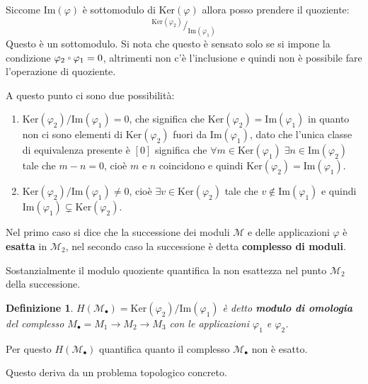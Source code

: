 \documentclass[10pt, twoside=false, x11names]{scrbook}
\newtheorem{definition}[theorem]{Definizione}
\newcommand{\M}{\mathcal{M}}
\newcommand{\im}[1]{\mathrm{Im}( #1 )}
\renewcommand{\ker}[1]{\mathrm{Ker}( #1)}
\newcommand*\quot[2]{{^{\textstyle #1}\big/_{\textstyle #2}}}
\let\latexcirc=\circ
\newcommand{\ccirc}{\mathbin{\mathchoice
  {\xcirc\scriptstyle}
  {\xcirc\scriptstyle}
  {\xcirc\scriptscriptstyle}
  {\xcirc\scriptscriptstyle}
}}
\newcommand{\xcirc}[1]{\vcenter{\hbox{$#1\latexcirc$}}}
\let\circ\ccirc
\let\phi\varphi
\begin{document}
Siccome $ \im{\phi} $ è sottomodulo di $ \ker{\phi} $ allora posso prendere
il quoziente:
\[
  \quot{\ker{\phi_2}}{\im{\phi_1}}
\]
Questo è un sottomodulo. Si nota che questo è sensato solo se si impone la condizione
$ \phi_2 \circ \phi_1 = 0 $, altrimenti non c'è l'inclusione e quindi non è possibile fare l'operazione
di quoziente.

A questo punto ci sono due possibilità:
\begin{enumerate}
\item $ {\ker {\phi_2}} \slash {\im{\phi_1}} = 0 $, che significa che $ \ker {\phi_2} = \im{\phi_1} $
  in quanto non ci sono elementi di $ \ker {\phi_2} $ fuori da $ \im{\phi_1} $, dato che l'unica
  classe di equivalenza presente è $ [0] $ significa che $ \forall m \in \ker{\phi_1} \; \exists n \in \im{\phi_2} $
  tale che $ m - n = 0 $, cioè $ m $ e $ n $ coincidono e quindi $ \ker {\phi_2} = \im{\phi_1} $.
\item $ {\ker {\phi_2}} \slash {\im{\phi_1}} \not= 0 $, cioè $ \exists v \in \ker {\phi_2} $
  tale che $ v \not \in \im {\phi_1} $ e quindi $ \im {\phi_1} \subsetneq \ker {\phi_2}$.
\end{enumerate}
Nel primo caso si dice che la successione dei moduli $ \M $ e delle
applicazioni $ \phi $ è \textbf{esatta} in $ \M_2$, nel secondo caso la
successione è detta \textbf{complesso di moduli}.

Sostanzialmente il modulo quoziente quantifica la non esattezza nel punto $ \M_2 $
della successione.

\begin{definition}
  $ H(\M_\bullet) = {\ker {\phi_2}} \slash {\im {\phi_1}} $ è detto \textbf{modulo di omologia} 
  del complesso $ M_\bullet = M_1 \longrightarrow M_2 \longrightarrow M_3 $ con le applicazioni $ \phi_1 $ e $ \phi_2 $.
\end{definition}
Per questo  $ H(\M_\bullet) $ quantifica quanto il complesso $ \M_\bullet $ non è esatto.

Questo deriva da un problema topologico concreto.
\end{document}
